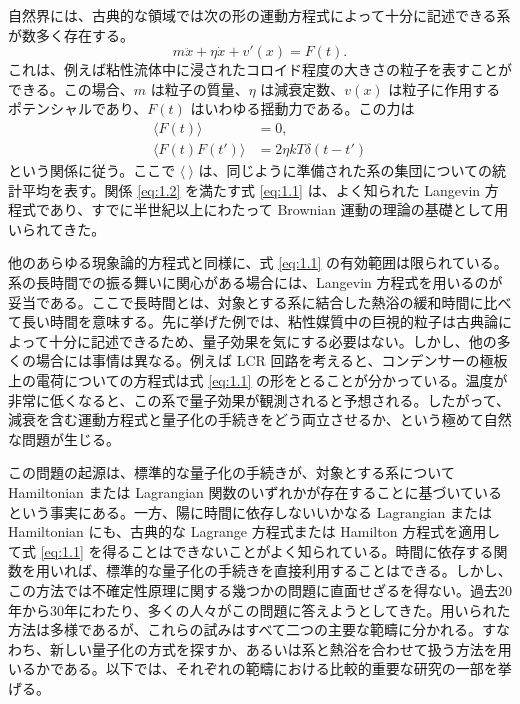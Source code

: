
自然界には、古典的な領域では次の形の運動方程式によって十分に記述できる系が数多く存在する。
\begin{equation}
 m\ddot{x}+\eta\dot{x}+v'(x)=F(t).
 \tag{1.1}\label{eq:1.1}
\end{equation}
これは、例えば粘性流体中に浸されたコロイド程度の大きさの粒子を表すことができる。この場合、$m$ は粒子の質量、$\eta$ は減衰定数、$v(x)$ は粒子に作用するポテンシャルであり、$F(t)$ はいわゆる揺動力である。この力は
\begin{equation}
 \begin{aligned}
 \langle F(t)\rangle&=0,\\
 \langle F(t)F(t')\rangle&=2\eta kT\delta(t-t')
 \end{aligned}
 \tag{1.2}\label{eq:1.2}
\end{equation}
という関係に従う。ここで $\langle\ \rangle$ は、同じように準備された系の集団についての統計平均を表す。関係 \eqref{eq:1.2} を満たす式 \eqref{eq:1.1} は、よく知られた Langevin 方程式であり、すでに半世紀以上にわたって Brownian 運動の理論の基礎として用いられてきた\cite{ref01}。

他のあらゆる現象論的方程式と同様に、式 \eqref{eq:1.1} の有効範囲は限られている。系の長時間での振る舞いに関心がある場合には、Langevin 方程式を用いるのが妥当である。ここで長時間とは、対象とする系に結合した熱浴の緩和時間に比べて長い時間を意味する。先に挙げた例では、粘性媒質中の巨視的粒子は古典論によって十分に記述できるため、量子効果を気にする必要はない。しかし、他の多くの場合には事情は異なる。例えば LCR 回路を考えると、コンデンサーの極板上の電荷についての方程式は式 \eqref{eq:1.1} の形をとることが分かっている。温度が非常に低くなると、この系で量子効果が観測されると予想される。したがって、減衰を含む運動方程式と量子化の手続きをどう両立させるか、という極めて自然な問題が生じる。

この問題の起源は、標準的な量子化の手続きが、対象とする系について Hamiltonian または Lagrangian 関数のいずれかが存在することに基づいているという事実にある。一方、陽に時間に依存しないいかなる Lagrangian または Hamiltonian にも、古典的な Lagrange 方程式または Hamilton 方程式を適用して式 \eqref{eq:1.1} を得ることはできないことがよく知られている。時間に依存する関数を用いれば、標準的な量子化の手続きを直接利用することはできる\cite{ref02}。しかし、この方法では不確定性原理に関する幾つかの問題に直面せざるを得ない\cite{ref03}。過去20年から30年にわたり、多くの人々がこの問題に答えようとしてきた。用いられた方法は多様であるが、これらの試みはすべて二つの主要な範疇に分かれる。すなわち、新しい量子化の方式を探すか、あるいは系と熱浴を合わせて扱う方法を用いるかである。以下では、それぞれの範疇における比較的重要な研究の一部を挙げる。

